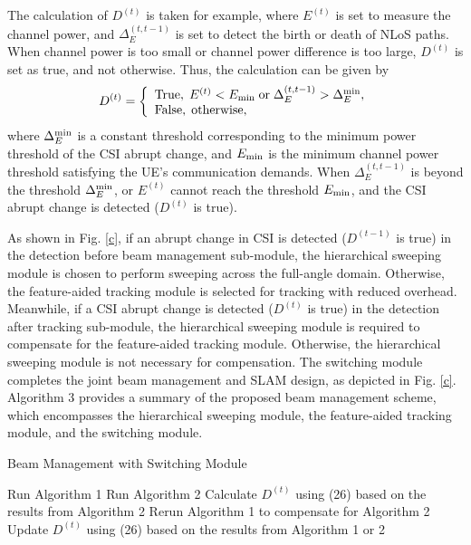 \documentclass[journal,12pt,onecolumn,draftclsnofoot,]{IEEEtran}
\begin{document}
The calculation of ${D^{(t)}}$ is taken for example, where ${E^{(t)}}$ is set to measure the channel power, and $\Delta _E^{({t,t - 1} )}$ is set to detect the birth or death of NLoS paths. 
When channel power is too small or channel power difference is too large, ${D^{(t)}}$ is set as true, and not otherwise. Thus, the calculation can be given by
\begin{equation}\label{28}
{D^{(t)}} = \left\{ {\begin{array}{*{20}{l}}
{{\rm{True}},\;
{E^{\left(t \right)}} < {E_{{\rm{min}}}}}
\;{\rm{ or }}\;
\Delta _E^{\left({t ,t - 1} \right)} > \Delta _E^{\rm min}
,\\
{{\rm{False,\;otherwise}}},
\end{array}} \right.
\end{equation}
\noindent where $\Delta _E^{\rm min}$ is a constant threshold corresponding to the minimum power threshold of the CSI abrupt change, and ${E_{{\rm{min}}}}$ is the minimum channel power threshold satisfying the UE's communication demands. 
When $\Delta _E^{({t ,t - 1} )}$ is beyond the threshold $\Delta _E^{\rm min}$, or ${E^{(t )}}$ cannot reach the threshold ${E_{{\rm{min}}}}$, and the CSI abrupt change is detected (${D^{(t )}}$ is true). 

As shown in Fig. \ref{c}, if an abrupt change in CSI is detected (${D^{(t-1 )}}$ is true) in the detection before beam management sub-module, the hierarchical sweeping module is chosen to perform sweeping across the full-angle domain. 
Otherwise, the feature-aided tracking module is selected for tracking with reduced overhead. {\color{black}Meanwhile, if a CSI abrupt change is detected (${D^{(t )}}$ is true) in the detection after tracking sub-module, the hierarchical sweeping module is required to compensate for the feature-aided tracking module. Otherwise, the hierarchical sweeping module is not necessary for compensation.} 
The switching module completes the joint beam management and SLAM design, as depicted in Fig. \ref{c}. Algorithm 3 provides a summary of the proposed beam management scheme, which encompasses the hierarchical sweeping module, the feature-aided tracking module, and the switching module. 


\begin{algorithm}[t]
\caption{{\color{black}Beam Management with Switching Module}}\label{A3}
{Run Algorithm 1\;
}
{
Run Algorithm 2\;
Calculate $D^{(t)}$ {\color{black}using} {(26)} based on the results from Algorithm 2\;
{{\color{black}Rerun Algorithm 1 to compensate for Algorithm 2}\;
}
}
Update $D^{(t)}$ {\color{black}using} {(26)} based on the results from Algorithm 1 or 2\;
\end{algorithm}
\end{document}
